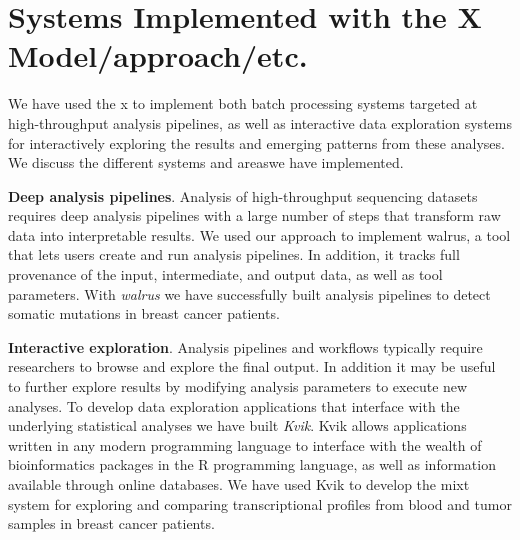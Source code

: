\section{Systems Implemented with the X Model/approach/etc.} 

We have used the \gls{x} to implement both batch processing systems targeted at
high-throughput analysis pipelines, as well as interactive data
exploration systems for interactively exploring the results and emerging
patterns from these analyses.  We discuss the different systems and areaswe have
implemented. 

\textbf{Deep analysis pipelines}. 
Analysis of high-throughput sequencing datasets requires deep analysis pipelines
with a large number of steps that transform raw data into interpretable
results\cite{diao2015building}. We used our approach to implement walrus, a tool
that lets users create and run analysis pipelines. In addition, it tracks full
provenance of the input, intermediate, and output data, as well as tool
parameters. With \emph{walrus} we have successfully built analysis pipelines to
detect somatic mutations in breast cancer patients. 

\textbf{Interactive exploration}. Analysis pipelines and workflows typically
require researchers to browse and explore the final output. In addition it may
be useful to further explore results by modifying analysis parameters to execute
new analyses.  To develop data exploration applications that interface with the
underlying statistical analyses we have built \emph{Kvik}. Kvik allows
applications written in any modern programming language to interface with the
wealth of bioinformatics packages in the R programming language, as well as
information available through online databases. We have used Kvik to develop the
\gls{mixt} system for exploring and comparing transcriptional profiles from
blood and tumor samples in breast cancer patients. 


